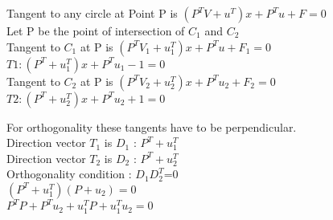 \documentclass{beamer}
\begin{document}
\begin{frame}
    Tangent to any circle at Point P is $(P^T V +u^T)x + P^T u +F = 0$\\
    \vspace{3mm}
    Let P be the point of intersection of $C_1$ and $C_2$\\
    \vspace{3mm}
    Tangent to $C_1$ at P is $(P^T V_1 +u_1^T)x + P^T u +F_1 = 0$\\
    \vspace{3mm}
    $T1 : (P^T +u_1^T)x + P^T u_1 -1 = 0 $\\
    \vspace{3mm}
    \vspace{3mm}
    \vspace{3mm}
    Tangent to $C_2$ at P is $(P^T V_2 +u_2^T)x + P^T u_2 +F_2 = 0$\\
    \vspace{3mm}
    $T2 : (P^T +u_2^T)x + P^T u_2 + 1 = 0 $
\end{frame}
\begin{frame}
    For orthogonality these tangents have to be perpendicular.\\
    \vspace{3mm}
    Direction vector $T_1$ is $D_1$ : $P^T +u_1^T$\\
    \vspace{3mm}
    Direction vector $T_2$ is $D_2$ : $P^T +u_2^T$\\
    \vspace{3mm}
    Orthogonality condition : $D_1D_2^T$=0\\
    \vspace{3mm}
    $(P^T + u_1^T)(P + u_2) = 0$\\
    \vspace{3mm}
    $P^TP + P^Tu_2 + u_1^TP + u_1^Tu_2 = 0$
\end{frame}
\end{document}

